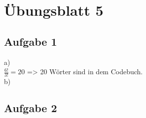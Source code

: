 \documentclass[12pt,a4paper,headsepline]{scrreprt}
\begin{document}


\section*{Übungsblatt 5}

\subsection*{Aufgabe 1}
a)\\
$\frac{6!}{3!} = 20$ => 20 Wörter sind in dem Codebuch.\\

b)\\



\subsection*{Aufgabe 2}
\end{document}
